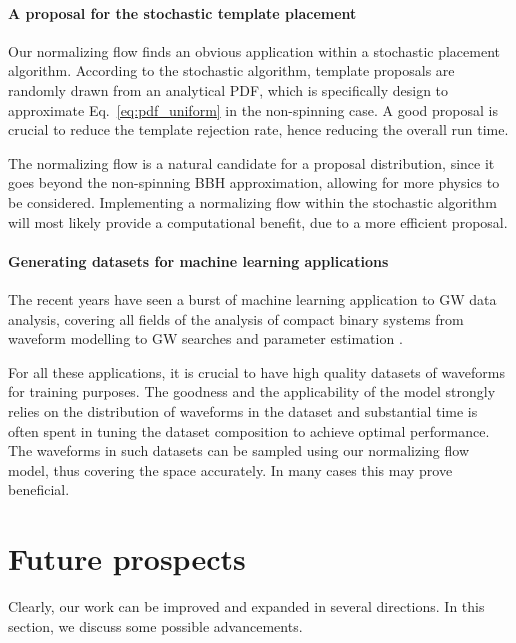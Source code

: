 \documentclass[twocolumn,showpacs,preprintnumbers,nofootinbib,prd,
superscriptaddress,10pt]{revtex4-2}
\begin{document}
\paragraph{A proposal for the stochastic template placement}

Our normalizing flow finds an obvious application within a stochastic placement algorithm. According to the stochastic algorithm, template proposals are randomly drawn from an analytical PDF, which is specifically design to approximate Eq.~\eqref{eq:pdf_uniform} in the non-spinning case.
A good proposal is crucial to reduce the template rejection rate, hence reducing the overall run time.

The normalizing flow is a natural candidate for a proposal distribution, since it goes beyond the non-spinning BBH approximation, allowing for more physics to be considered. Implementing a normalizing flow within the stochastic algorithm will most likely provide a computational benefit, due to a more efficient proposal.

\paragraph{Generating datasets for machine learning applications}

The recent years have seen a burst of machine learning application to GW data analysis, covering all fields of the analysis of compact binary systems from waveform modelling \cite{Khan:2020fso, PhysRevD.103.043020, Thomas:2022rmc, Tissino:2022thn} to GW searches \cite{Gebhard:2019ldz, Schafer:2020kor, Schafer:2021fea, Baltus:2021nme} and parameter estimation \cite{Green:2020hst, Alvares:2020bjg, Williams:2021qyt, Langendorff:2022fzq, Williams:2023ppp}.

For all these applications, it is crucial to have high quality datasets of waveforms for training purposes.
The goodness and the applicability of the model strongly relies on the distribution of waveforms in the dataset and substantial time is often spent in tuning the dataset composition to achieve optimal performance.
The waveforms in such datasets can be sampled using our normalizing flow model, thus covering the space accurately. In many cases this may prove beneficial.

\section{Future prospects} \label{sec:improvements}

Clearly, our work can be improved and expanded in several directions. In this section, we discuss some possible advancements.
\end{document}
